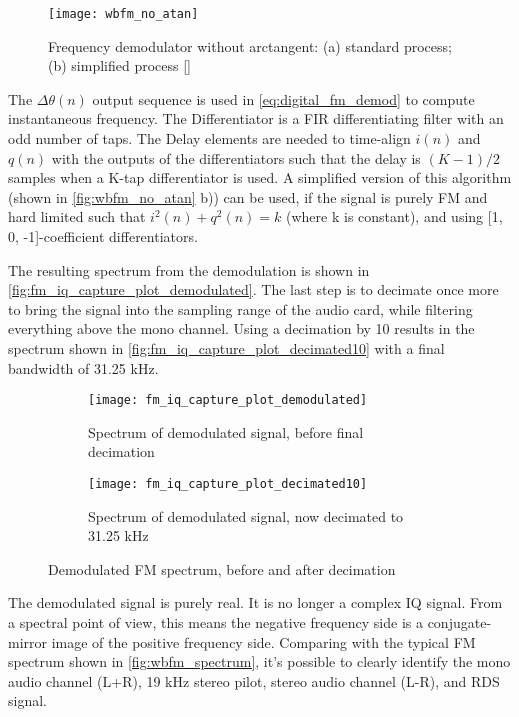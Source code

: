 \begin{figure}[H]
  \centering
  \texttt{[image: wbfm\_no\_atan]}
  \caption{Frequency demodulator without arctangent: (a) standard process; (b) simplified process [\citeauthor{wbfm_alt_receiver}]}
  \label{fig:wbfm_no_atan}
\end{figure}

The $\Delta\theta(n)$ output sequence is used in \eqref{eq:digital_fm_demod} to compute instantaneous frequency. The Differentiator is a FIR differentiating filter with an odd number of taps. The Delay elements are needed to time-align $i(n)$ and $q(n)$ with the outputs of the differentiators such that the delay is $(K-1)/2$ samples when a K-tap differentiator is used. A simplified version of this algorithm (shown in \autoref{fig:wbfm_no_atan} b)) can be used, if the signal is purely FM and hard limited such that $i^2(n)+q^2(n)=k$ (where k is constant), and using [1, 0, -1]-coefficient differentiators.

The resulting spectrum from the demodulation is shown in \autoref{fig:fm_iq_capture_plot_demodulated}. The last step is to decimate once more to bring the signal into the sampling range of the audio card, while filtering everything above the mono channel. Using a decimation by 10 results in the spectrum shown in \autoref{fig:fm_iq_capture_plot_decimated10} with a final bandwidth of 31.25 kHz.

\begin{figure} [H]
  \begin{subfigure}{.5\textwidth}
    \centering
    \texttt{[image: fm\_iq\_capture\_plot\_demodulated]}
    \caption{Spectrum of demodulated signal, before final decimation}
    \label{fig:fm_iq_capture_plot_demodulated}
  \end{subfigure}%
  \begin{subfigure}{.5\textwidth}
    \centering
    \texttt{[image: fm\_iq\_capture\_plot\_decimated10]}
    \caption{Spectrum of demodulated signal, now decimated to 31.25 kHz}
    \label{fig:fm_iq_capture_plot_decimated10}
  \end{subfigure}
  \caption{Demodulated FM spectrum, before and after decimation}
\end{figure}

The demodulated signal is purely real. It is no longer a complex IQ signal. From a spectral point of view, this means the negative frequency side is a conjugate-mirror image of the positive frequency side. Comparing with the typical FM spectrum shown in \autoref{fig:wbfm_spectrum}, it's possible to clearly identify the mono audio channel (L+R), 19 kHz stereo pilot, stereo audio channel (L-R), and RDS signal.

